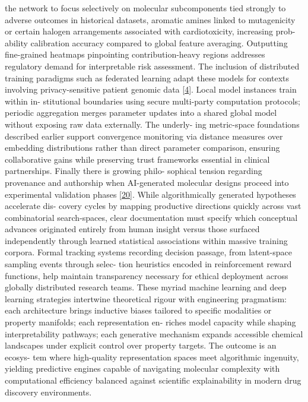 \documentclass[
]{article}
\begin{document}
the network to focus selectively on molecular subcomponents tied
strongly to adverse outcomes in historical datasets, aromatic amines
linked to mutagenicity or certain halogen arrangements associated with
cardiotoxicity, increasing prob- ability calibration accuracy compared
to global feature averaging. Outputting fine-grained heatmaps
pinpointing contribution-heavy regions addresses regulatory demand for
interpretable risk assessment. The inclusion of distributed training
paradigms such as federated learning adapt these models for contexts
involving privacy-sensitive patient genomic data
{[}\hyperref[_bookmark44]{4}{]}. Local model instances train within in-
stitutional boundaries using secure multi-party computation protocols;
periodic aggregation merges parameter updates into a shared global model
without exposing raw data externally. The underly- ing metric-space
foundations described earlier support convergence monitoring via
distance measures over embedding distributions rather than direct
parameter comparison, ensuring collaborative gains while preserving
trust frameworks essential in clinical partnerships. Finally there is
growing philo- sophical tension regarding provenance and authorship when
AI-generated molecular designs proceed into experimental validation
phases {[}\hyperref[_bookmark60]{20}{]}. While algorithmically generated
hypotheses accelerate dis- covery cycles by mapping productive
directions quickly across vast combinatorial search-spaces, clear
documentation must specify which conceptual advances originated entirely
from human insight versus those surfaced independently through learned
statistical associations within massive training corpora. Formal
tracking systems recording decision passage, from latent-space sampling
events through selec- tion heuristics encoded in reinforcement reward
functions, help maintain transparency necessary for ethical deployment
across globally distributed research teams. These myriad machine
learning and deep learning strategies intertwine theoretical rigour with
engineering pragmatism: each architecture brings inductive biases
tailored to specific modalities or property manifolds; each
representation en- riches model capacity while shaping interpretability
pathways; each generative mechanism expands accessible chemical
landscapes under explicit control over property targets. The outcome is
an ecosys- tem where high-quality representation spaces meet algorithmic
ingenuity, yielding predictive engines capable of navigating molecular
complexity with computational efficiency balanced against scientific
explainability in modern drug discovery environments.
\end{document}
